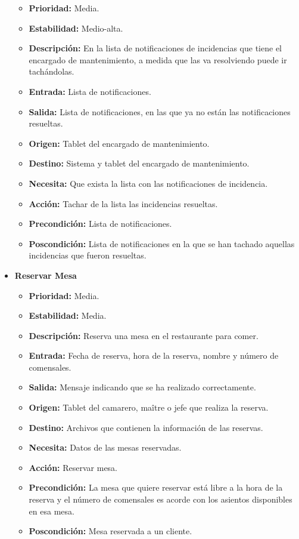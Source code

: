 \documentclass[spanish,a4paper,11pt, twoside]{report}	%
\begin{document}
\begin{itemize}
\begin{itemize}
			\item \textbf{Prioridad: }Media.
			\item \textbf{Estabilidad: }Medio-alta.
			\item \textbf{Descripción: }En la lista de notificaciones de incidencias que tiene el encargado de mantenimiento, a medida que las va resolviendo puede ir tachándolas.
			\item \textbf{Entrada: }Lista de notificaciones.
			\item \textbf{Salida: }Lista de notificaciones, en las que ya no están las notificaciones resueltas.
			\item \textbf{Origen: }Tablet del encargado de mantenimiento.
			\item \textbf{Destino: }Sistema y tablet del encargado de mantenimiento.
			\item \textbf{Necesita: }Que exista la lista con las notificaciones de incidencia.
			\item \textbf{Acción: }Tachar de la lista las incidencias resueltas.
			\item \textbf{Precondición: }Lista de notificaciones.
			\item \textbf{Poscondición: }Lista de notificaciones en la que se han tachado aquellas incidencias que fueron resueltas.

		\end{itemize}%

\item \textbf{Reservar Mesa} %

		\begin{itemize}
			\item \textbf{Prioridad: } Media.
			\item \textbf{Estabilidad: } Media.
			\item \textbf{Descripción: } Reserva una mesa en el restaurante para comer.
			\item \textbf{Entrada: } Fecha de reserva, hora de la reserva, nombre y número de comensales.
			\item \textbf{Salida: } Mensaje indicando que se ha realizado correctamente.
			\item \textbf{Origen: } Tablet del camarero, maître o jefe que realiza la reserva.
			\item \textbf{Destino: } Archivos que contienen la información de las reservas.
			\item \textbf{Necesita: } Datos de las mesas reservadas.
			\item \textbf{Acción: } Reservar mesa.
			\item \textbf{Precondición: } La mesa que quiere reservar está libre a la hora de la reserva y el número de comensales es acorde con los asientos disponibles en esa mesa.
			\item \textbf{Poscondición: } Mesa reservada a un cliente.


\end{itemize}
\end{itemize}
\end{document}
